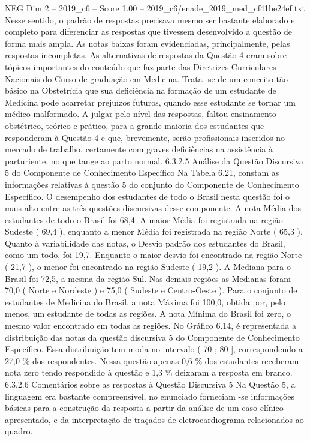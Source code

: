 \begin{textsample}{NEG Dim 2 – 2019\_c6 – Score 1.00 – 2019\_c6/enade\_2019\_med\_cf41be24ef.txt}
Nesse sentido, o padrão de respostas precisava mesmo ser bastante elaborado e completo para diferenciar as respostas que tivessem desenvolvido a questão de forma mais ampla.
As notas baixas foram evidenciadas, principalmente, pelas respostas incompletas.
As alternativas de respostas da Questão 4 eram sobre tópicos importantes do conteúdo que faz parte das Diretrizes Curriculares Nacionais do Curso de graduação em Medicina.
Trata -se de um conceito tão básico na Obstetrícia que sua deficiência na formação de um estudante de Medicina pode acarretar prejuízos futuros, quando esse estudante se tornar um médico malformado.
A julgar pelo nível das respostas, faltou ensinamento obstétrico, teórico e prático, para a grande maioria dos estudantes que responderam à Questão 4 e que, brevemente, serão profissionais inseridos no mercado de trabalho, certamente com graves deficiências na assistência à parturiente, no que tange ao parto normal. 6.3.2.5 Análise da Questão Discursiva 5 do Componente de Conhecimento Específico Na Tabela 6.21, constam as informações relativas à questão 5 do conjunto do Componente de Conhecimento Específico.
O desempenho dos estudantes de todo o Brasil nesta questão foi o mais alto entre as três questões discursivas desse componente.
A nota Média dos estudantes de todo o Brasil foi 68,4.
A maior Média foi registrada na região Sudeste ( 69,4 ), enquanto a menor Média foi registrada na região Norte ( 65,3 ).
Quanto à variabilidade das notas, o Desvio padrão dos estudantes do Brasil, como um todo, foi 19,7.
Enquanto o maior desvio foi encontrado na região Norte ( 21,7 ), o menor foi encontrado na região Sudeste ( 19,2 ).
A Mediana para o Brasil foi 72,5, a mesma da região Sul.
Nas demais regiões as Medianas foram 70,0 ( Norte e Nordeste ) e 75,0 ( Sudeste e Centro-Oeste ).
Para o conjunto de estudantes de Medicina do Brasil, a nota Máxima foi 100,0, obtida por, pelo menos, um estudante de todas as regiões.
A nota Mínima do Brasil foi zero, o mesmo valor encontrado em todas as regiões.
No Gráfico 6.14, é representada a distribuição das notas da questão discursiva 5 do Componente de Conhecimento Específico.
Essa distribuição tem moda no intervalo ( 70 ; 80 ], correspondendo a 27,0 \% dos respondentes.
Nessa questão apenas 0,6 \% dos estudantes receberam nota zero tendo respondido à questão e 1,3 \% deixaram a resposta em branco. 6.3.2.6 Comentários sobre as respostas à Questão Discursiva 5 Na Questão 5, a linguagem era bastante compreensível, no enunciado forneciam -se informações básicas para a construção da resposta a partir da análise de um caso clínico apresentado, e da interpretação de traçados de eletrocardiograma relacionados ao quadro.

\end{textsample}
